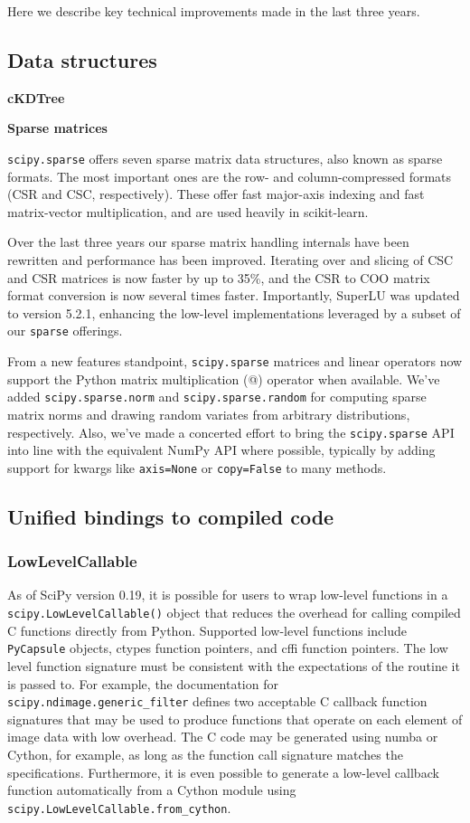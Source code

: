 \documentclass[fleqn,10pt]{wlscirep}
\begin{document}
Here we describe key technical improvements made in the last three years.

\subsection*{Data structures}
\textbf{cKDTree}

\textbf{Sparse matrices}

\texttt{scipy.sparse} offers seven sparse matrix data structures,
also known as sparse formats. The most important ones are the row- 
and column-compressed formats (CSR and CSC, respectively). 
These offer fast major-axis indexing and fast matrix-vector multiplication,
and are used heavily in scikit-learn.

Over the last three years our sparse matrix handling internals have
been rewritten and performance has been improved. Iterating over 
and slicing of CSC and CSR matrices is now faster by up to 35\%,
and the CSR to COO matrix format conversion is now several times faster.
Importantly, SuperLU\cite{superlu_ug99} was updated to version 5.2.1, enhancing
the low-level implementations leveraged by a subset of our \texttt{sparse}
offerings.

From a new features standpoint, \texttt{scipy.sparse} matrices and linear
operators now support the Python matrix multiplication (@) operator when
available. We've added \texttt{scipy.sparse.norm} and \texttt{scipy.sparse.random} 
for computing sparse matrix norms and drawing random variates from arbitrary 
distributions, respectively. Also, we've made a concerted effort to bring the
\texttt{scipy.sparse} API into line with the equivalent NumPy API where possible,
typically by adding support for kwargs like \texttt{axis=None} or
\texttt{copy=False} to many methods.

\subsection*{Unified bindings to compiled code}
\subsubsection*{LowLevelCallable}
As of SciPy version 0.19, it is possible for users to wrap low-level
functions in a \texttt{scipy.LowLevelCallable()} object that reduces
the overhead for calling compiled C functions directly from Python.
Supported low-level functions include \texttt{PyCapsule} objects,
ctypes function pointers, and cffi function pointers. The low level
function signature must be consistent with the expectations of the
routine it is passed to. For example, the documentation for
\texttt{scipy.ndimage.generic\_filter} defines two acceptable C callback
function signatures that may be used to produce functions that operate
on each element of image data with low overhead. The C code may be
generated using numba or Cython, for example, as long as the function
call signature matches the specifications. Furthermore, it is even
possible to generate a low-level callback function automatically
from a Cython module using \texttt{scipy.LowLevelCallable.from\_cython}.
\end{document}
